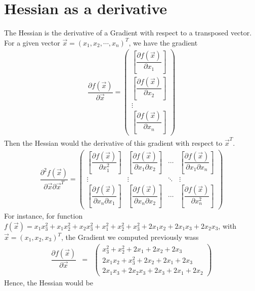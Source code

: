 \documentclass[conference,final,11pt,technote,onecolumn]{IEEEtran}\usepackage[]{graphicx}\usepackage[]{color}
\begin{document}
\section{Hessian as a derivative}
\label{term:Hessian}
The Hessian is the derivative of a Gradient with respect to a transposed vector. For a given vector $\vec x =(x_1, x_2, \cdots, x_n)^T$, we have the gradient
\begin{eqnarray}
\nonumber \dfrac{\partial f(\vec x)}{\partial \vec x} = \begin{pmatrix} \left[ \dfrac{\partial f(\vec x)}{\partial x_1}\right]\\
\left[ \dfrac{\partial f(\vec x)}{\partial x_2}\right]\\
\vdots\\
\left[ \dfrac{\partial f(\vec x)}{\partial x_n}\right] \end{pmatrix}
\end{eqnarray}
Then the Hessian would the derivative of this gradient with respect to $\vec x^T$.
\begin{eqnarray}
\nonumber \dfrac{\partial^2 f(\vec x)}{\partial \vec x\partial \vec x^T} = \begin{pmatrix} \left[ \dfrac{\partial f(\vec x)}{\partial x^2_1}\right] & \left[ \dfrac{\partial f(\vec x)}{\partial x_1 \partial x_2}\right] & \cdots & \left[ \dfrac{\partial f(\vec x)}{\partial x_1\partial x_n}\right]\\
\vdots & \vdots & \ddots & \vdots\\
\left[ \dfrac{\partial f(\vec x)}{\partial x_n\partial x_1}\right] & \left[ \dfrac{\partial f(\vec x)}{\partial x_n \partial x_2}\right] & \cdots & \left[ \dfrac{\partial f(\vec x)}{\partial x^2_n}\right]
 \end{pmatrix}
\end{eqnarray}
For instance, for function $f(\vec x) = x_1x^2_3 + x_1x^2_2 + x_2x^2_3 + x^2_1 + x^2_2 + x^2_3 + 2x_1x_2 + 2x_1x_3 + 2x_2x_3$, with $\vec x = (x_1, x_2, x_3)^T$, the Gradient we computed previously wass
\begin{eqnarray}
\nonumber \dfrac{\partial f(\vec x)}{\partial \vec x} &=& \begin{pmatrix}
x^2_3+x^2_2+2x_1+2x_2+2x_3\\
2x_1x_2+x^2_3+2x_2+2x_1+2x_3\\
2x_1x_3+2x_2x_3+2x_3+2x_1+2x_2
\end{pmatrix}
\end{eqnarray}
Hence, the Hessian would be
\end{document}

